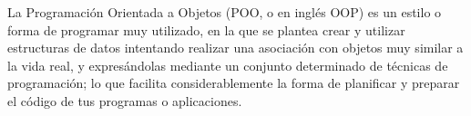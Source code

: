 









La {{Programación Orientada a Objetos}} (POO, o en inglés OOP) es un estilo o forma de programar muy utilizado, en la que se plantea crear y utilizar estructuras de datos intentando realizar una asociación con objetos muy similar  a la vida real, y expresándolas mediante un conjunto determinado de técnicas de programación; lo que facilita considerablemente la forma de planificar y preparar el código de tus programas o aplicaciones.\\


